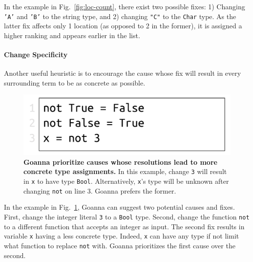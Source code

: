 \documentclass[pdflatex,sn-nature,Numbered]{sn-jnl}%
\begin{document}
    In the example in Fig.~\ref{fig:loc-count}, there exist two possible fixes: 1) Changing \texttt{'A'} and \texttt{'B'} to the string type, and 2) changing \texttt{"C"} to the \texttt{Char} type. As the latter fix affects only 1 location (as opposed to 2 in the former), it is assigned a higher ranking and appears earlier in the list.

    \paragraph{Change Specificity}
	Another useful heuristic is to encourage the cause whose fix will result in every surrounding term to be as concrete as possible.
	
	
   \begin{figure}[ht!]
        \centering
        \includegraphics[width=0.5\linewidth]{images/Specificity}
        \caption[Goanna prioritize causes whose resolutions lead to more concrete type assignments]{\textbf{Goanna prioritize causes whose resolutions lead to more concrete type assignments.} In this example, change \texttt{3} will result in \texttt{x} to have type \texttt{Bool}. Alternatively, \texttt{x}'s type will be unknown after changing \texttt{not} on line 3. Goanna prefers the former.} 
        \label{fig:specificity}
    \end{figure}

    In the example in Fig.~\ref{fig:specificity}, Goanna can suggest two potential causes and fixes. First, change the integer literal \texttt{3} to a \texttt{Bool} type. Second, change the function \texttt{not} to a different function that accepts an integer as input. The second fix results in variable \texttt{x} having a less concrete type. Indeed, \texttt{x} can have any type if not limit what function to replace \texttt{not} with. Goanna prioritizes the first cause over the second. 

    
    
\end{document}

